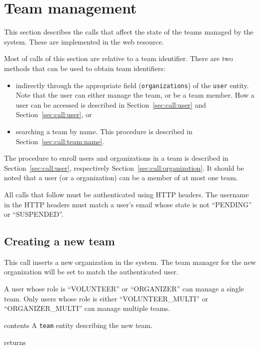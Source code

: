 \section{Team management}
\label{sec:call:team}

This section describes the calls that affect the state of the teams managed by
the system. These are implemented in the
 web resource.

Most of calls of this section are relative to a team identifier. There are two
methods that can be used to obtain team identifiers:
\begin{itemize}
  \item indirectly through the appropriate field (\texttt{organizations}) of the
    \texttt{user} entity. Note that the user can either manage the team, or be a
    team member. How a user can be accessed is described in
    Section~\ref{sec:call:user} and Section~\ref{sec:call:user}, or
  \item searching a team by name. This procedure is described in
    Section~\ref{sec:call:team:name}.
\end{itemize}

The procedure to enroll users and organizations in a team is described in
Section~\ref{sec:call:user}, respectively Section~\ref{sec:call:organization}.
It should be noted that a user (or a organization) can be a member of at most
one team. 

All calls that follow must be authenticated using HTTP headers. The username in
the HTTP headers must match a user's email whose state is not ``PENDING'' or
``SUSPENDED''.


\subsection{Creating a new team}
\label{sec:team:create}

This call inserts a new organization in the system. The team manager for the new
organization will be set to match the authenticated user.

A user whose role is ``VOLUNTEER'' or ``ORGANIZER'' can manage a single team.
Only users whose role is either ``VOLUNTEER\_MULTI'' or ``ORGANIZER\_MULTI'' can
manage multiple teams.

\begin{apidata}{contents}
  A \texttt{team} entity describing the new team.
\end{apidata}
\begin{apidata}{returns}
  \begin{datalist}
  \end{datalist}
\end{apidata}


